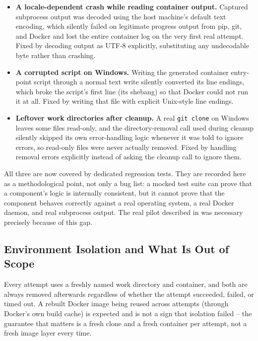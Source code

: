 \begin{itemize}
  \item \textbf{A locale-dependent crash while reading container output.}
        Captured subprocess output was decoded using the host machine's
        default text encoding, which silently failed on legitimate progress
        output from pip, git, and Docker and lost the entire container log
        on the very first real attempt. Fixed by decoding output as UTF-8
        explicitly, substituting any undecodable byte rather than crashing.
  \item \textbf{A corrupted script on Windows.} Writing the generated
        container entry-point script through a normal text write silently
        converted its line endings, which broke the script's first line (its
        shebang) so that Docker could not run it at all. Fixed by writing
        that file with explicit Unix-style line endings.
  \item \textbf{Leftover work directories after cleanup.} A real
        \texttt{git clone} on Windows leaves some files read-only, and the
        directory-removal call used during cleanup silently skipped its own
        error-handling logic whenever it was told to ignore errors, so
        read-only files were never actually removed. Fixed by handling
        removal errors explicitly instead of asking the cleanup call to
        ignore them.
\end{itemize}

All three are now covered by dedicated regression tests. They are recorded
here as a methodological point, not only a bug list: a mocked test suite
can prove that a component's logic is internally consistent, but it cannot
prove that the component behaves correctly against a real operating system,
a real Docker daemon, and real subprocess output. The real pilot described
in  was necessary precisely because of this gap.

\subsection{Environment Isolation and What Is Out of Scope}

Every attempt uses a freshly named work directory and container, and both
are always removed afterwards regardless of whether the attempt succeeded,
failed, or timed out. A rebuilt Docker image being reused across attempts
(through Docker's own build cache) is expected and is not a sign that
isolation failed -- the guarantee that matters is a fresh clone and a fresh
container per attempt, not a fresh image layer every time.

